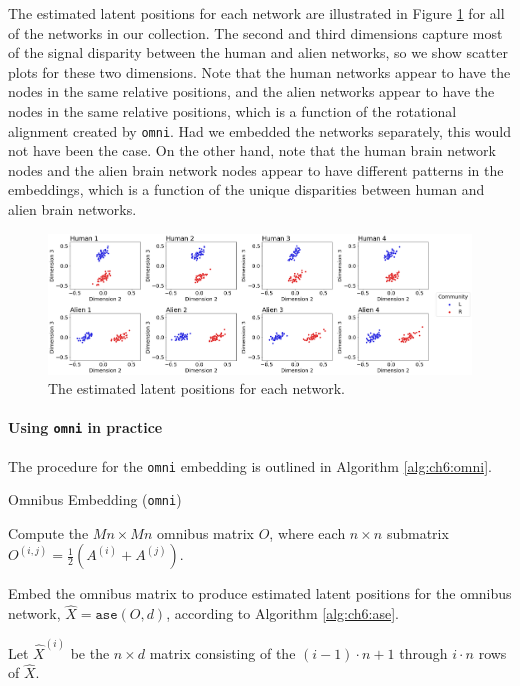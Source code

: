 The estimated latent positions for each network are illustrated in Figure \ref{fig:ch6:multinet:omni:individual} for all of the networks in our collection. The second and third dimensions capture most of the signal disparity between the human and alien networks, so we show scatter plots for these two dimensions. Note that the human networks appear to have the nodes in the same relative positions, and the alien networks appear to have the nodes in the same relative positions, which is a function of the rotational alignment created by \texttt{omni}. Had we embedded the networks separately, this would not have been the case. On the other hand, note that the human brain network nodes and the alien brain network nodes appear to have different patterns in the embeddings, which is a function of the unique disparities between human and alien brain networks.

\begin{figure}[h]
    \centering
    \includegraphics[width=\linewidth]{representations/ch6/Images/omni_ind.png}
    \caption[OMNI estimated latent positions]{The estimated latent positions for each network.}
    \label{fig:ch6:multinet:omni:individual}
\end{figure}

\paragraph*{Using \texttt{omni} in practice}

The procedure for the \texttt{omni} embedding is outlined in Algorithm \ref{alg:ch6:omni}. 



\begin{algorithm}[h]\caption{Omnibus Embedding (\texttt{omni})}
\label{alg:ch6:omni}
\SetAlgoLined

Compute the $Mn \times Mn$ omnibus matrix $O$, where each $n \times n$ submatrix $O^{(i,j)} = \frac{1}{2}\left(A^{(i)} + A^{(j)}\right)$.

Embed the omnibus matrix to produce estimated latent positions for the omnibus network, $\hat X = \texttt{ase}(O, d)$, according to Algorithm \ref{alg:ch6:ase}. 

Let $\hat X^{(i)}$ be the $n \times d$ matrix consisting of the $(i - 1)\cdot n + 1$ through $i\cdot n$ rows of $\hat X$.

\end{algorithm}


